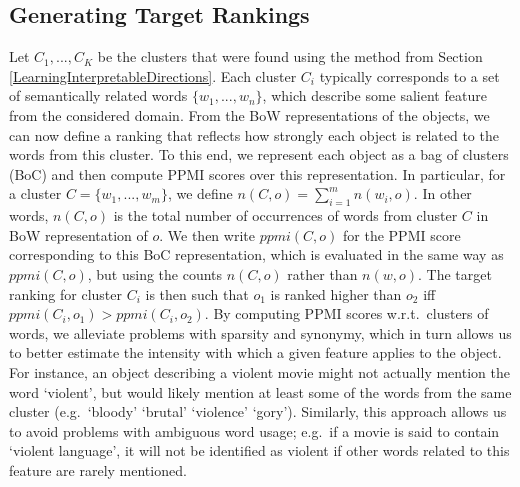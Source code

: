 \subsection{Generating Target Rankings}\label{secTargetRankings} \raggedbottom 
Let $C_1,...,C_K$ be the clusters that were found using the method from Section \ref{LearningInterpretableDirections}. 
Each cluster $C_i$ typically corresponds to a set of semantically related words $\{w_1,...,w_n\}$, which describe some salient feature from the considered domain. 
From the BoW representations of the objects, we can now define a ranking that reflects how strongly each object is related to the words from this cluster. To this end, we represent each object as a bag of clusters (BoC) and then compute PPMI scores over this representation. In particular, for a cluster $C = \{w_1,...,w_m\}$, we define $n(C,o)=\sum_{i=1}^m n(w_i,o)$. In other words, $n(C,o)$ is the total number of occurrences of words from cluster $C$ in BoW representation of $o$. We then write $\textit{ppmi}(C,o)$ for the PPMI score corresponding to this BoC representation, which is evaluated in the same way as $\textit{ppmi}(C,o)$, but using the counts $n(C,o)$ rather than $n(w,o)$. The target ranking for cluster $C_i$ is then such that $o_1$ is ranked higher than $o_2$ iff $\textit{ppmi}(C_i,o_1) > \textit{ppmi}(C_i,o_2)$. By computing PPMI scores w.r.t.\ clusters of words, we alleviate problems with sparsity and synonymy, which in turn allows us to better estimate the intensity with which a given feature applies to the object. For instance, an object describing a violent movie might not actually mention the word `violent', but would likely mention at least some of the words from the same cluster (e.g.\ `bloody' `brutal' `violence' `gory'). Similarly, this approach allows us to avoid problems with ambiguous word usage; e.g.\ if a movie is said to contain `violent language', it will not be identified as violent if other words related to this feature are rarely mentioned.



